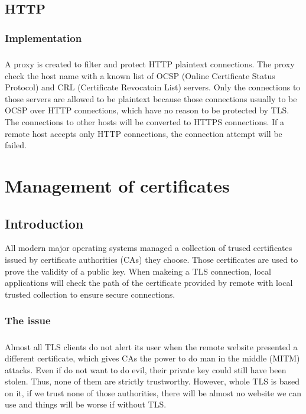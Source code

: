 \documentclass[mscthesis]{usiinfthesis}
\begin{document}
\section{HTTP}
\subsection{Implementation}
\paragraph{}
A proxy is created to filter and protect HTTP plaintext connections. The proxy check the host name with a known list of OCSP (Online Certificate Status Protocol) and CRL (Certificate Revocatoin List) servers. Only the connections to those servers are allowed to be plaintext because those connections usually to be OCSP over HTTP connections, which have no reason to be protected by TLS. The connections to other hosts will be converted to HTTPS connections. If a remote host accepts only HTTP connections, the connection attempt will be failed.

\chapter{Management of certificates}

\section{Introduction}
All modern major operating systems managed a collection of trused certificates issued by certificate authorities (CAs) they choose. Those certificates are used to prove the validity of a public key. When makeing a TLS connection, local applications will check the path of the certificate provided by remote with local trusted collection to ensure secure connections.
\subsection{The issue}
\paragraph{}
Almost all TLS clients do not alert its user when the remote website presented a different certificate, which gives CAs the power to do man in the middle (MITM) attacks. Even if  do not want to do evil, their private key could still have been stolen. Thus, none of them are strictly trustworthy. However, whole TLS is based on it, if we trust none of those authorities, there will be almost no website we can use and things will be worse if without TLS.
\end{document}
